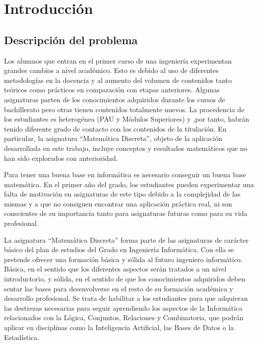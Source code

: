 \documentclass[openright,twoside,10pt]{book}
\begin{document}
    \tableofcontents %

    \cleardoublepage
    \listoffigures %

    \cleardoublepage
    \listoftables %

    \chapter{Introducción}
    
    \section{Descripción del problema}\label{descripciuxf3n-del-problema}
    
    
    Los alumnos que entran en el primer curso de una ingeniería experimentan
    grandes cambios a nivel académico. Esto es debido al uso de diferentes
    metodologías en la docencia y al aumento del volumen de contenidos tanto
    teóricos como prácticos en comparación con etapas anteriores. Algunas
    asignaturas parten de los conocimientos adquiridos durante los cursos de
    bachillerato pero otras tienen contenidos totalmente nuevos. La
    procedencia de los estudiantes es heterogénea (PAU y Módulos Superiores)
    y ,por tanto, habrán tenido diferente grado de contacto con los
    contenidos de la titulación. En particular, la asignatura
    \enquote{Matemática Discreta}, objeto de la aplicación desarrollada en
    este trabajo, incluye conceptos y resultados matemáticos que no han sido
    explorados con anterioridad.
    
    Para tener una buena base en informática es necesario conseguir un buena
    base matemática. En el primer año del grado, los estudiantes pueden
    experimentar una falta de motivación en asignaturas de este tipo debido
    a la complejidad de las mismas y a que no consiguen encontrar una
    aplicación práctica real, ni son conscientes de su importancia tanto
    para asignaturas futuras como para su vida profesional.
    
    La asignatura \enquote{Matemática Discreta} forma parte de las
    asignaturas de carácter básico del plan de estudios del Grado en
    Ingeniería Informática. Con ella se pretende ofrecer una formación
    básica y sólida al futuro ingeniero informático. Básica, en el sentido
    que los diferentes aspectos serán tratados a un nivel introductorio, y
    sólida, en el sentido de que los conocimientos adquiridos deben sentar
    las bases para desenvolverse en el resto de su formación académica y
    desarrollo profesional. Se trata de habilitar a los estudiantes para que
    adquieran las destrezas necesarias para seguir aprendiendo los aspectos
    de la Informática relacionados con la Lógica, Conjuntos, Relaciones y
    Combinatoria, que podrán aplicar en disciplinas como la Inteligencia
    Artificial, las Bases de Datos o la Estadística.
    
\end{document}
